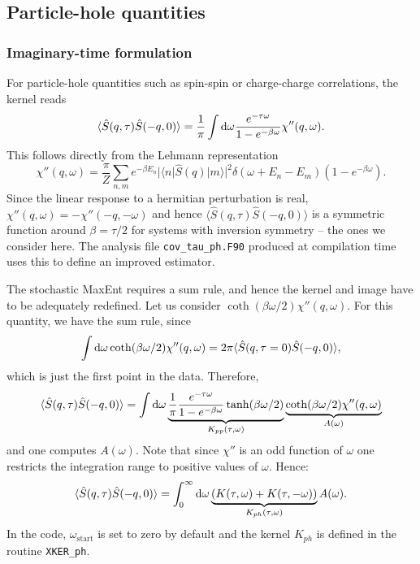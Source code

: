 \subsection{Particle-hole quantities }

\noindent
\subsubsection*{Imaginary-time formulation}
 For particle-hole quantities such as spin-spin or charge-charge correlations, 
the kernel reads
\begin{equation}
	\langle \hat{S}(q,\tau) \hat{S}(-q,0) \rangle  = \frac{1}{\pi} 
   \int \mathrm{d} \omega  \frac{e^{- \tau \omega} }{ 1 - e^{-\beta  \omega} } \chi''(q,\omega).
\end{equation}
This follows directly from the  Lehmann representation
\begin{equation}
 \chi''(q,\omega)  = \frac{\pi}{Z} \sum_{n,m} e^{-\beta E_n} |\langle n | \hat{S}(q) | m \rangle |^2 
\delta ( \omega + E_n - E_m) \left( 1 - e^{-\beta  \omega} \right) .
\end{equation}
Since the linear response to a hermitian perturbation  is real, $\chi''(q,\omega)  = - \chi''(-q,-\omega)$ and hence $\langle \hat{S}(q,\tau) \hat{S}(-q,0) \rangle $ is a symmetric function around $\beta= \tau/2$ for systems with inversion symmetry -- the ones we consider here. The analysis file \texttt{cov\_tau\_ph.F90} produced at compilation time uses this to define an improved estimator. 

The  stochastic MaxEnt requires a sum rule, and hence the kernel and image have to be adequately redefined. 
Let us consider $\coth(\beta \omega/2) \chi''(q,\omega)$. For this quantity, we have the sum rule, since
\begin{equation}
	\int \mathrm{d} \omega 	\coth(\beta \omega/2) \chi''(q,\omega) = 
  2 \pi \langle \hat{S}(q,\tau=0) \hat{S}(-q,0) \rangle ,
\end{equation}
which is just the first point in the data. Therefore,
\begin{equation}
	\langle \hat{S}(q,\tau) \hat{S}(-q,0) \rangle  =  
       \int \mathrm{d} \omega  \underbrace{ \frac{1}{\pi} \frac{e^{- \tau \omega} }
            { 1 - e^{-\beta  \omega} } \tanh(\beta \omega/2)  }_{K_{pp}(\tau,\omega)} 
       \underbrace{ \coth(\beta \omega/2)   \chi''(q,\omega) }_{A(\omega)} 
\label{Kpp.eq}
\end{equation}
and one computes $A(\omega)$.
Note that since $\chi'' $ is an odd function of $\omega$ one restricts the integration range to positive values of $\omega$. 
Hence: 
\begin{equation}
	\langle \hat{S}(q,\tau) \hat{S}(-q,0) \rangle  =  
       \int_{0}^{\infty}  \mathrm{d} \omega \underbrace{\left( K(\tau,\omega)  + K(\tau,-\omega) \right)}_{K_{ph}(\tau,\omega)}  A(\omega).
\end{equation}
In the code, $\omega_\mathrm{start}$ is set to zero by default and the kernel $K_{ph}$ is defined in the  routine \texttt{XKER\_ph}.

